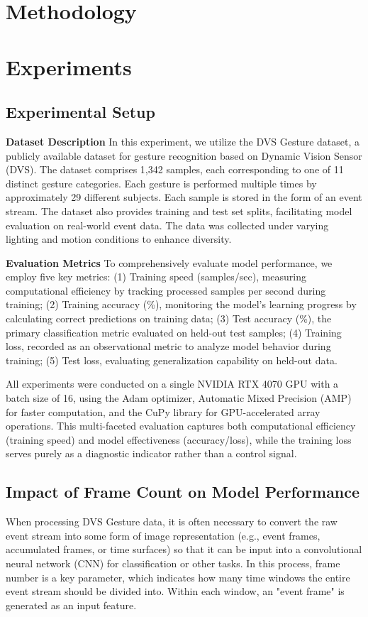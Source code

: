 \documentclass[conference]{IEEEtran}
\begin{document}
\section{Methodology}


\section{Experiments}
\subsection{Experimental Setup}
\textbf{Dataset Description} In this experiment, we utilize the DVS Gesture dataset, a publicly available dataset for gesture recognition based on Dynamic Vision Sensor (DVS). 
The dataset comprises 1,342 samples, each corresponding to one of 11 distinct gesture categories.
Each gesture is performed multiple times by approximately 29 different subjects. 
Each sample is stored in the form of an event stream. 
The dataset also provides training and test set splits, facilitating model evaluation on real-world event data.
The data was collected under varying lighting and motion conditions to enhance diversity.

\textbf{Evaluation Metrics} To comprehensively evaluate model performance, we employ five key metrics: 
(1) Training speed (samples/sec), measuring computational efficiency by tracking processed samples per second during training; 
(2) Training accuracy (\%), monitoring the model's learning progress by calculating correct predictions on training data; 
(3) Test accuracy (\%), the primary classification metric evaluated on held-out test samples;
(4) Training loss, recorded as an observational metric to analyze model behavior during training; 
(5) Test loss, evaluating generalization capability on held-out data. 

All experiments were conducted on a single NVIDIA RTX 4070 GPU with a batch size of 16, using the Adam optimizer, 
Automatic Mixed Precision (AMP) for faster computation, and the CuPy library for GPU-accelerated array operations. 
This multi-faceted evaluation captures both computational efficiency (training speed) and model effectiveness (accuracy/loss), 
while the training loss serves purely as a diagnostic indicator rather than a control signal.

\subsection{Impact of Frame Count on Model Performance}
When processing DVS Gesture data, it is often necessary to convert the raw event stream into some form of image representation (e.g., event frames, accumulated frames, or time surfaces) so that it can be input into a convolutional neural network (CNN) for classification or other tasks. In this process, frame number is a key parameter, which indicates how many time windows the entire event stream should be divided into. Within each window, an "event frame" is generated as an input feature.
\end{document}
